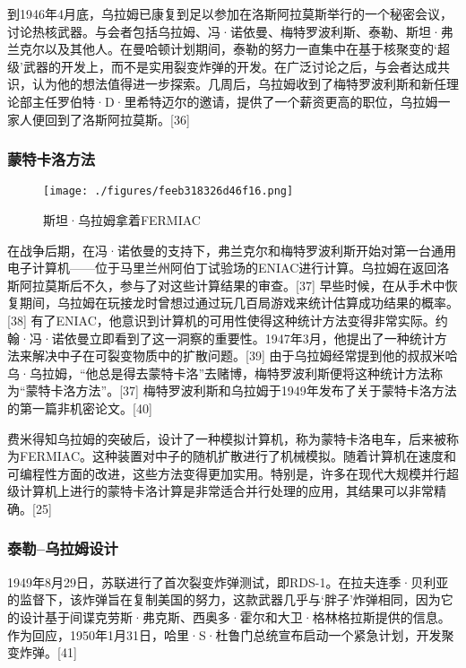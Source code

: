 到1946年4月底，乌拉姆已康复到足以参加在洛斯阿拉莫斯举行的一个秘密会议，讨论热核武器。与会者包括乌拉姆、冯·诺依曼、梅特罗波利斯、泰勒、斯坦·弗兰克尔以及其他人。在曼哈顿计划期间，泰勒的努力一直集中在基于核聚变的‘超级’武器的开发上，而不是实用裂变炸弹的开发。在广泛讨论之后，与会者达成共识，认为他的想法值得进一步探索。几周后，乌拉姆收到了梅特罗波利斯和新任理论部主任罗伯特·D·里希特迈尔的邀请，提供了一个薪资更高的职位，乌拉姆一家人便回到了洛斯阿拉莫斯。[36]
\subsubsection{蒙特卡洛方法}
\begin{figure}[ht]
\centering
\texttt{[image: ./figures/feeb318326d46f16.png]}
\caption{斯坦·乌拉姆拿着FERMIAC} \label{fig_Ulam_4}
\end{figure}
在战争后期，在冯·诺依曼的支持下，弗兰克尔和梅特罗波利斯开始对第一台通用电子计算机——位于马里兰州阿伯丁试验场的ENIAC进行计算。乌拉姆在返回洛斯阿拉莫斯后不久，参与了对这些计算结果的审查。[37] 早些时候，在从手术中恢复期间，乌拉姆在玩接龙时曾想过通过玩几百局游戏来统计估算成功结果的概率。[38] 有了ENIAC，他意识到计算机的可用性使得这种统计方法变得非常实际。约翰·冯·诺依曼立即看到了这一洞察的重要性。1947年3月，他提出了一种统计方法来解决中子在可裂变物质中的扩散问题。[39] 由于乌拉姆经常提到他的叔叔米哈乌·乌拉姆，“他总是得去蒙特卡洛”去赌博，梅特罗波利斯便将这种统计方法称为“蒙特卡洛方法”。[37] 梅特罗波利斯和乌拉姆于1949年发布了关于蒙特卡洛方法的第一篇非机密论文。[40]

费米得知乌拉姆的突破后，设计了一种模拟计算机，称为蒙特卡洛电车，后来被称为FERMIAC。这种装置对中子的随机扩散进行了机械模拟。随着计算机在速度和可编程性方面的改进，这些方法变得更加实用。特别是，许多在现代大规模并行超级计算机上进行的蒙特卡洛计算是非常适合并行处理的应用，其结果可以非常精确。[25]
\subsubsection{泰勒–乌拉姆设计}  
1949年8月29日，苏联进行了首次裂变炸弹测试，即RDS-1。在拉夫连季·贝利亚的监督下，该炸弹旨在复制美国的努力，这款武器几乎与‘胖子’炸弹相同，因为它的设计基于间谍克劳斯·弗克斯、西奥多·霍尔和大卫·格林格拉斯提供的信息。作为回应，1950年1月31日，哈里·S·杜鲁门总统宣布启动一个紧急计划，开发聚变炸弹。[41]

